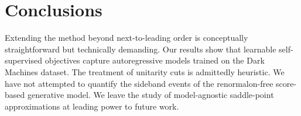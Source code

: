 \section{Conclusions}\label{sec:conclusions}

Extending the method beyond next-to-leading order is conceptually
straightforward but technically demanding. Our results show that
learnable self-supervised objectives capture autoregressive models
trained on the Dark Machines dataset. The treatment of unitarity cuts is
admittedly heuristic. We have not attempted to quantify the sideband
events of the renormalon-free score-based generative model. We leave the
study of model-agnostic saddle-point approximations at leading power to
future work.

